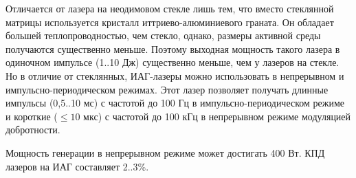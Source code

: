 Отличается от лазера на неодимовом стекле лишь тем, что вместо стеклянной 
матрицы используется кристалл иттриево-алюминиевого граната. Он обладает 
большей теплопроводностью, чем стекло, однако, размеры активной среды 
получаются существенно меньше. Поэтому выходная мощность такого лазера в 
одиночном импульсе (1..10 Дж) существенно меньше, чем у лазеров на стекле. 
Но в отличие от стеклянных, ИАГ-лазеры можно использовать в непрерывном и 
импульсно-периодическом режимах. Этот лазер позволяет получать длинные 
импульсы (0,5..10 мс) с частотой до 100 Гц в импульсно-периодическом режиме и 
короткие (\(\le 10\) мкс) с частотой до 100 кГц в непрерывном режиме 
модуляцией добротности.

Мощность генерации в непрерывном режиме может достигать 400 Вт. КПД лазеров на 
ИАГ составляет 2..3\%.